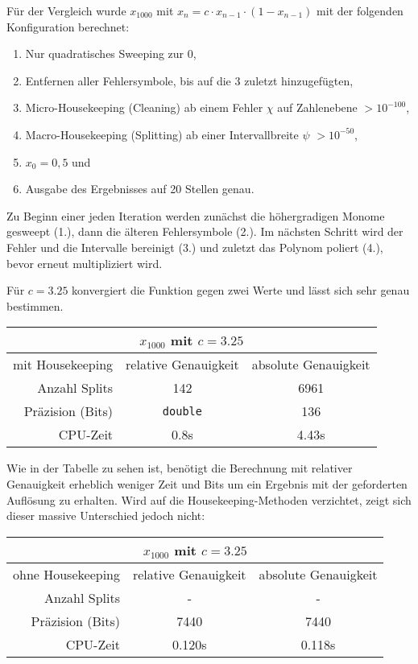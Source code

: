 Für der Vergleich wurde $x_{1000}$ mit $x_n = c \cdot x_{n-1} \cdot (1 - x_{n-1})$ mit der folgenden Konfiguration berechnet:
\begin{enumerate}
 \item Nur quadratisches Sweeping zur 0,
 \item Entfernen aller Fehlersymbole, bis auf die 3 zuletzt hinzugefügten,
 \item Micro-Housekeeping (Cleaning) ab einem Fehler $\chi$ auf Zahlenebene $>10^{-100}$,
 \item Macro-Housekeeping (Splitting) ab einer Intervallbreite $\psi$ $>10^{-50}$,
 \item $x_0 = 0,5$ und
 \item Ausgabe des Ergebnisses auf 20 Stellen genau.
\end{enumerate}
Zu Beginn einer jeden Iteration werden zunächst die höhergradigen Monome gesweept (1.), dann die älteren Fehlersymbole (2.). Im nächsten Schritt wird der Fehler und die Intervalle bereinigt (3.) und zuletzt das Polynom poliert (4.), bevor erneut multipliziert wird. 

Für $c = 3.25$ konvergiert die Funktion gegen zwei Werte und lässt sich sehr genau bestimmen.

\begin{center}
\begin{tabular}{|r|c|c|}
\hline
\multicolumn{3}{|c|}{$x_{1000}$ mit $c=3.25$}\\
\hline
 mit Housekeeping&relative Genauigkeit & absolute Genauigkeit \\
 \hline
 \hline
 Anzahl Splits & 142 & 6961 \\
 Präzision (Bits) & \verb+double+ & 136 \\
 CPU-Zeit & 0.8s & 4.43s\\
 \hline
\end{tabular}
\end{center}

Wie in der Tabelle zu sehen ist, benötigt die Berechnung mit relativer Genauigkeit erheblich weniger Zeit und Bits um ein Ergebnis mit der geforderten Auflösung zu erhalten. Wird auf die Housekeeping-Methoden verzichtet, zeigt sich dieser massive Unterschied jedoch nicht:

\begin{center}
\begin{tabular}{|r|c|c|}
\hline
\multicolumn{3}{|c|}{$x_{1000}$ mit $c=3.25$}\\
\hline
 ohne Housekeeping &relative Genauigkeit & absolute Genauigkeit \\
 \hline
 \hline
 Anzahl Splits & -& -\\
 Präzision (Bits) & 7440 & 7440 \\
 CPU-Zeit & 0.120s & 0.118s\\
 \hline
\end{tabular}
\end{center}


